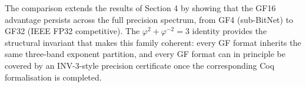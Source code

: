 The comparison extends the results of Section 4 by
showing that the GF16 advantage persists across the
full precision spectrum, from GF4 (sub-BitNet) to
GF32 (IEEE FP32 competitive). The
\(\varphi^2 + \varphi^{-2} = 3\) identity provides
the structural invariant that makes this family
coherent: every GF format inherits the same
three-band exponent partition, and every GF format
can in principle be covered by an INV-3-style
precision certificate once the corresponding Coq
formalisation is completed.

